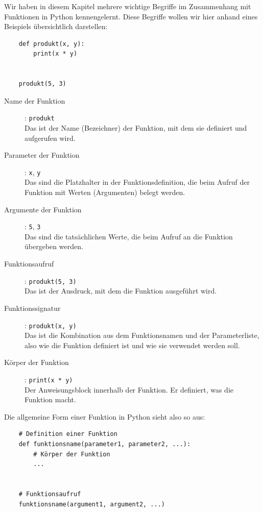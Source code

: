 \begin{myoverview}\label{myoverview:NomenklaturFunktion}
	Wir haben in diesem Kapitel mehrere wichtige Begriffe im Zusammenhang mit Funktionen in Python kennengelernt. Diese Begriffe wollen wir hier anhand eines Beispiels übersichtlich darstellen:
	\begin{lstlisting}
    def produkt(x, y):
        print(x * y)


    produkt(5, 3)
    \end{lstlisting}
	\bigskip
	\begin{description}
		\item[Name der Funktion]: \lstinline|produkt|\\
		      Das ist der Name (Bezeichner) der Funktion, mit dem sie definiert und aufgerufen wird.
		\item[Parameter der Funktion]: \lstinline|x|, \lstinline|y|\\
		      Das sind die Platzhalter in der Funktionsdefinition, die beim Aufruf der Funktion mit Werten (Argumenten) belegt werden.
		\item[Argumente der Funktion]: \lstinline|5|, \lstinline|3|\\
		      Das sind die tatsächlichen Werte, die beim Aufruf an die Funktion übergeben werden.
		\item[Funktionsaufruf]: \lstinline|produkt(5, 3)|\\
		      Das ist der Ausdruck, mit dem die Funktion ausgeführt wird.
		\item[Funktionssignatur]: \lstinline|produkt(x, y)|\\
		      Das ist die Kombination aus dem Funktionsnamen und der Parameterliste, also wie die Funktion definiert ist und wie sie verwendet werden soll.
		\item[Körper der Funktion]: \lstinline|print(x * y)|\\
		      Der Anweisungsblock innerhalb der Funktion. Er definiert, was die Funktion macht.
	\end{description}

	\medskip
	Die allgemeine Form einer Funktion in Python sieht also so aus:
	\begin{lstlisting}
	# Definition einer Funktion
	def funktionsname(parameter1, parameter2, ...):
		# Körper der Funktion
		...
	

	# Funktionsaufruf
	funktionsname(argument1, argument2, ...)
	\end{lstlisting}
\end{myoverview}

